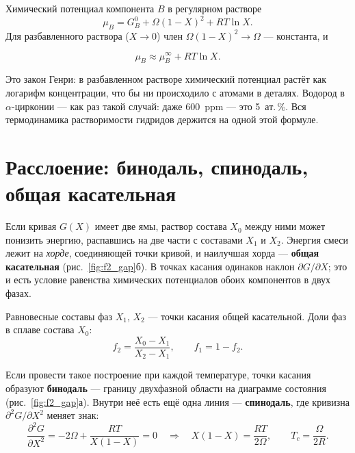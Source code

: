
Химический потенциал компонента $B$ в регулярном растворе
\begin{equation}
\mu_B = G_B^0 + \Omega(1-X)^2 + RT\ln X .
\end{equation}
Для разбавленного раствора ($X\to 0$) член $\Omega(1-X)^2\to\Omega$ --- константа, и
\begin{keyf}
\[
\mu_B \approx \mu_B^{\infty} + RT\ln X .
\]
\end{keyf}
Это закон Генри: в разбавленном растворе химический потенциал растёт как логарифм концентрации, что бы ни
происходило с атомами в деталях. Водород в $\alpha$-цирконии --- как раз такой случай: даже 600~ppm --- это
5~ат.\,\%. Вся термодинамика растворимости гидридов держится на одной этой формуле.

\section{Расслоение: бинодаль, спинодаль, общая касательная}

Если кривая $G(X)$ имеет две ямы, раствор состава $X_0$ между ними может понизить энергию, распавшись на две
части с составами $X_1$ и $X_2$. Энергия смеси лежит на \emph{хорде}, соединяющей точки кривой, и наилучшая
хорда --- \textbf{общая касательная} (рис.~\ref{fig:f2_gap}б). В точках касания одинаков наклон
$\partial G/\partial X$; это и есть условие равенства химических потенциалов обоих компонентов в двух фазах.

\begin{keyf}
Равновесные составы фаз $X_1$, $X_2$ --- точки касания общей касательной. Доли фаз в сплаве состава $X_0$:
\[
f_2 = \frac{X_0 - X_1}{X_2 - X_1},\qquad f_1 = 1 - f_2 .
\]
\end{keyf}

Если провести такое построение при каждой температуре, точки касания образуют \textbf{бинодаль} --- границу
двухфазной области на диаграмме состояния (рис.~\ref{fig:f2_gap}а). Внутри неё есть ещё одна линия ---
\textbf{спинодаль}, где кривизна $\partial^2G/\partial X^2$ меняет знак:
\begin{equation}
\frac{\partial^2 G}{\partial X^2} = -2\Omega + \frac{RT}{X(1-X)} = 0
\quad\Rightarrow\quad X(1-X) = \frac{RT}{2\Omega},\qquad T_c = \frac{\Omega}{2R}.
\end{equation}

